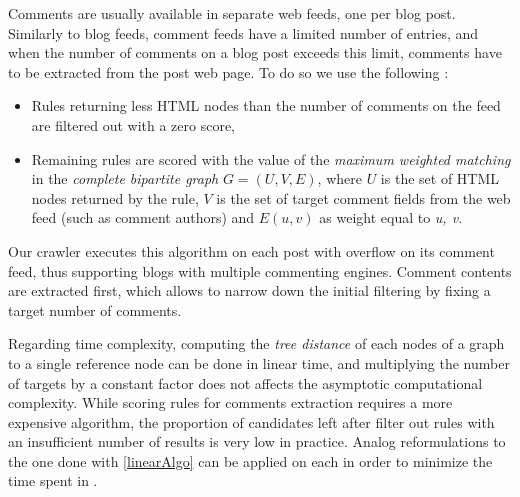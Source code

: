 Comments are usually available in separate web feeds, one per blog post. Similarly to blog feeds, comment feeds have a limited number of entries, and when the number of comments on a blog post exceeds this limit, comments have to be extracted from the post web page. To do so we use the following :
\begin{itemize}
  \item Rules returning less HTML nodes than the number of comments on the feed are filtered out with a zero score,
  \item Remaining rules are scored with the value of the \emph{maximum weighted matching} in the \emph{complete bipartite graph} $G = (U, V, E)$, where $U$ is the set of HTML nodes returned by the rule, $V$ is the set of target comment fields from the web feed (such as comment authors) and $E(u, v)$ as weight equal to \code{(}\emph{u, v}\code{)}.
\end{itemize}
Our crawler executes this algorithm on each post with overflow on its comment feed, thus supporting blogs with multiple commenting engines. Comment contents are extracted first, which allows to narrow down the initial filtering by fixing a target number of comments.

Regarding time complexity, computing the \emph{tree distance} of each nodes of a graph to a single reference node can be done in linear time, and multiplying the number of targets by a constant factor does not affects the asymptotic computational complexity. While scoring rules for comments extraction requires a more expensive algorithm, the proportion of candidates left after filter out rules with an insufficient number of results is very low in practice. Analog reformulations to the one done with \autoref{linearAlgo} can be applied on each  in order to minimize the time spent in .
